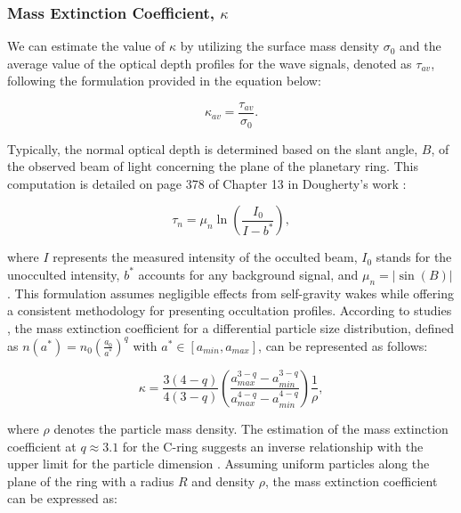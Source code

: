 \documentclass{article}
\begin{document}
\subsubsection{Mass Extinction Coefficient, $\kappa$}

We can estimate the value of $\kappa$ by utilizing the surface mass density $\sigma_{0}$ and the average value of the optical depth profiles for the wave signals, denoted as $\tau_{av}$, following the formulation provided in the equation below:

\begin{equation}
    \kappa_{av} = \frac{\tau_{av}}{\sigma_{0}}.
\end{equation}

Typically, the normal optical depth is determined based on the slant angle, $B$, of the observed beam of light concerning the plane of the planetary ring. This computation is detailed on page 378 of Chapter 13 in Dougherty's work \cite{Dougherty2009SaturnFC}:

\begin{equation}
    \tau_{n} = \mu_{n} \ln\left(\frac{I_{0}}{I - b^{*}}\right),
\end{equation}

where $I$ represents the measured intensity of the occulted beam, $I_{0}$ stands for the unocculted intensity, $b^{*}$ accounts for any background signal, and $\mu_{n} = |\sin(B)|$. This formulation assumes negligible effects from self-gravity wakes while offering a consistent methodology for presenting occultation profiles. According to studies \cite{2011Icar..216..292B, ctx2241679689740001851}, the mass extinction coefficient for a differential particle size distribution, defined as $n(a^{*}) = n_{0}(\frac{a_{0}}{a^{*}})^{q}$ with $a^{*} \in [a_{min},a_{max}]$, can be represented as follows:

\begin{equation}
    \kappa = \frac{3(4 - q)}{4(3 - q)}\left(\frac{a_{max}^{3-q} - a_{min}^{3-q}}{a_{max}^{4-q} - a_{min}^{4-q}}\right)\frac{1}{\rho},
\end{equation}

where $\rho$ denotes the particle mass density. The estimation of the mass extinction coefficient at $q\approx3.1$ for the C-ring suggests an inverse relationship with the upper limit for the particle dimension \cite{2011Icar..216..292B}. Assuming uniform particles along the plane of the ring with a radius $R$ and density $\rho$, the mass extinction coefficient can be expressed as:
\end{document}
